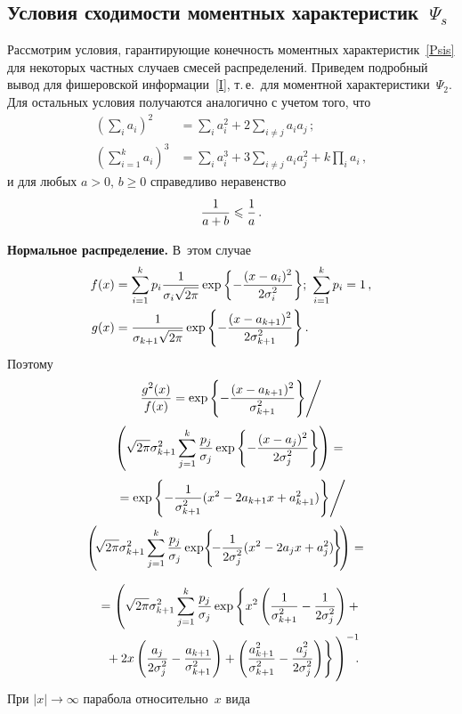 \begin{multicols}{2}
\subsection{Условия сходимости моментных характеристик~$\Psi_s$}

Рассмотрим условия, гарантирующие конеч\-ность моментных
характеристик~\eqref{Psis} для не\-ко\-торых частных случаев смесей
распределений. Приведем подробный вывод для фишеровской\linebreak
информации~\eqref{I}, т.\,е.\ для моментной характеристики~$\Psi_2$.
Для остальных условия получаются аналогично с учетом того, что
\begin{align*}
\left(\sum\limits_i a_i\right)^2&=\sum\limits_i
a_i^2+2\sum\limits_{i\neq j} a_i a_j\,;\\
\left(\sum\limits_{i=1}^k
a_i\right)^3&=\sum\limits_i a_i^3+3\sum\limits_{i\neq j} a_i
a_j^2+k\prod\limits_i a_i\,,
\end{align*}
и для любых $a>0$, $b\geqslant0$ справедливо неравенство
$$
\displaystyle\frac{\displaystyle 1\mathstrut}{\displaystyle a+b\mathstrut}\leqslant\displaystyle\frac{\displaystyle 1\mathstrut}{\displaystyle a\mathstrut}\,.
$$

\textbf{Нормальное распределение.} В~этом случае
\begin{align*}
f(x)&=\sum\limits_{i=1}^{k}p_i\displaystyle\frac{\displaystyle 1\mathstrut}{\displaystyle \sigma_i\sqrt{2\pi}\mathstrut}
\exp{\left\{-\displaystyle\frac{\displaystyle (x-a_i)^2\mathstrut}{\displaystyle 2\sigma_i^2\mathstrut}\right\}};\
\sum\limits_{i=1}^{k}p_i=1\,,\\
g(x)&=\displaystyle\frac{\displaystyle 1\mathstrut}{\displaystyle \sigma_{k+1}\sqrt{2\pi}\mathstrut}\exp{\left\{-\displaystyle\frac{\displaystyle (x-a_{k+1})^2\mathstrut}{\displaystyle 2\sigma_{k+1}^2\mathstrut}\right\}}\,.
\end{align*}
Поэтому
\begin{multline*}
\fr{g^2(x)}{f(x)}=
{\exp\left\{-\fr{(x-a_{k+1})^2}{\sigma_{k+1}^2}\right\}}\Bigg/\\[3pt]
\left({\sqrt{2\pi}\sigma^2_{k+1}\sum_{j=1}^k\fr{p_j}{\sigma_j}
\exp\left\{-\fr{(x-a_j)^2}{2\sigma_j^2}\right\}}\right)={}\\[3pt]
{}={\exp\left\{-\fr{1}{\sigma_{k+1}^2}(x^2-2a_{k+1}x+a_{k+1}^2)\right\}}\Bigg /\\[3pt]
\!\!\!\!\left(\!{\sqrt{2\pi}\sigma^2_{k+1}
\sum_{j=1}^k\fr{p_j}{\sigma_j}
\exp\!\left\{\!-\fr{1}{2\sigma_j^2}(x^2-2a_jx+a_j^2)\!\right\}}\!\right)={}
\end{multline*}


\noindent
\begin{multline}
{}=\left(
\sqrt{2\pi}\sigma^2_{k+1}\sum_{j=1}^k\fr{p_j}{\sigma_j}
\exp\left\{x^2\left(\fr{1}{\sigma_{k+1}^2}-\fr{1}{2\sigma_j^2}\right)
+{}\right.\right.\\
\!\!\!\left.\left.{}+2x\left(\fr{a_j}{2\sigma_j^2}-\frac{a_{k+1}}{\sigma_{k+1}^2}\right)
+\left(\fr{a_{k+1}^2}{\sigma_{k+1}^2}-\fr{a_j^2}{2\sigma_j^2}\right)\right\}
\vphantom{\left(
\sqrt{2\pi}\sigma^2_{k+1}\sum_{j=1}^k\fr{p_j}{\sigma_j}
\exp\left\{x^2\left(\fr{1}{\sigma_{k+1}^2}-\fr{1}{2\sigma_j^2}\right)
+{}\right.\right.}
\right)^{-1}\!\!\!.\!\!\!
\label{inv}
\end{multline}
При $|x|\to\infty$ парабола относительно~$x$ вида


\end{multicols}
